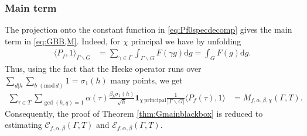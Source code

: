\documentclass[12pt]{amsart}
\theoremstyle{definition}
\theoremstyle{remark}
\numberwithin{equation}{section}
\newcommand{\1}{{\mathbf 1}}
\renewcommand{\d}{\mathrm d}
\renewcommand{\pmod}[1]{\,\,(\mathrm{mod}\,{#1})}
\begin{document}
\subsubsection{Main term}
The projection onto the constant function in \eqref{eq:Pf0specdecomp} gives the main term in \eqref{eq:GBB,M}. Indeed, for $\chi$ principal we have by unfolding
\begin{align*}
    \langle P_{f} ,1 \rangle_{\Gamma \backslash G}&=\sum_{\gamma \in \Gamma} \int_{\Gamma \backslash G} F(\gamma g) \d g= \int_{ G} F(g) \d g.
\end{align*}
 Thus, using the fact that the Hecke operator runs over $\sum_{d|h}\sum_{b  \pmod{d}} 1=\sigma_1(h)$ many points, we get
\begin{align*}
   \sum_{\tau \in T}  \sum_{\gcd(h,q)=1} \alpha(\tau) \frac{\beta_h \sigma_1(h)}{\sqrt{h}} \mathbf{1}_{\chi \,\mathrm{principal}}\frac{1}{|\Gamma \backslash G|} \langle P_{f}(\tau) ,1\rangle&= M_{f,\alpha,\beta,\chi}(\Gamma,T).
\end{align*}
Consequently, the proof of Theorem \ref{thm:Gmainblackbox} is reduced to estimating $\mathcal{C}_{f,\alpha,\beta}(\Gamma,T)$ and $\mathcal{E}_{f,\alpha,\beta}(\Gamma,T)$.
\end{document}
